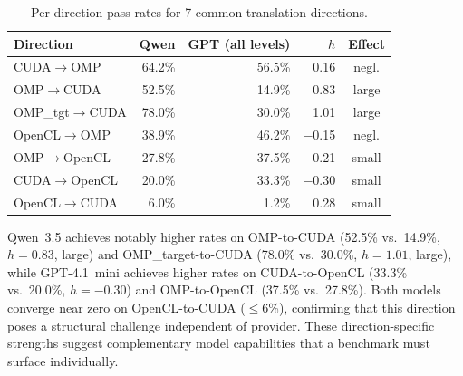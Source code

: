 \documentclass{article}
\begin{document}
\begin{table}[h]
\centering
\caption{Per-direction pass rates for 7 common translation directions.}
\label{tab:cross-model-direction}
\footnotesize
\begin{tabular}{lrrrc}
\toprule
\textbf{Direction} & \textbf{Qwen} & \textbf{GPT (all levels)} & \textbf{$h$} & \textbf{Effect} \\
\midrule
CUDA$\to$OMP             & 64.2\% & 56.5\% & 0.16  & negl. \\
OMP$\to$CUDA             & 52.5\% & 14.9\% & 0.83  & large \\
OMP\_tgt$\to$CUDA        & 78.0\% & 30.0\% & 1.01  & large \\
OpenCL$\to$OMP           & 38.9\% & 46.2\% & $-$0.15 & negl. \\
OMP$\to$OpenCL           & 27.8\% & 37.5\% & $-$0.21 & small \\
CUDA$\to$OpenCL          & 20.0\% & 33.3\% & $-$0.30 & small \\
OpenCL$\to$CUDA          &  6.0\% &  1.2\% & 0.28  & small \\
\bottomrule
\end{tabular}
\end{table}

Qwen~3.5 achieves notably higher rates on OMP-to-CUDA (52.5\% vs.\
14.9\%, $h = 0.83$, large) and OMP\_target-to-CUDA (78.0\% vs.\ 30.0\%, $h = 1.01$, large),
while GPT-4.1~mini achieves higher rates on CUDA-to-OpenCL (33.3\% vs.\
20.0\%, $h = -0.30$) and OMP-to-OpenCL (37.5\% vs.\ 27.8\%). Both
models converge near zero on OpenCL-to-CUDA ($\leq$6\%), confirming
that this direction poses a structural challenge independent of provider.
These direction-specific strengths suggest complementary model
capabilities that a benchmark must surface individually.
\end{document}
